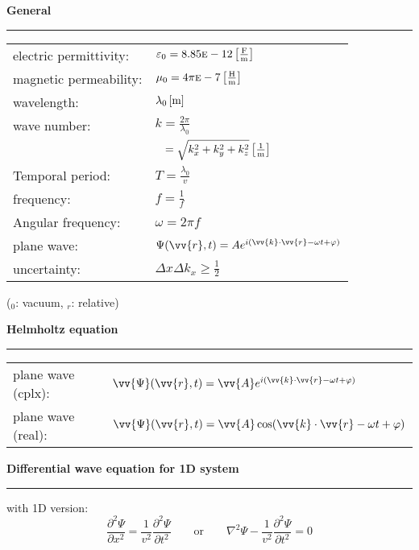 
\vspace{2mm}
\normalsize\textbf{General}\small
\hrule
\vspace{2pt}
{
	\setlength{\extrarowheight}{4pt}
	\begin{tabular}{l l}
		electric permittivity: & $\varepsilon_0 = 8.85\textsc{e}-12 \unit[2]{\frac{F}{m}}$          \\
		magnetic permeability: & $\mu_0=4\pi\textsc{e}-7 \unit[2]{\frac{H}{m}}$                     \\
		wavelength:            & $\lambda_0 \unit[2]{m}$                                            \\
		wave number:           & $k=\frac{2\pi}{\lambda_0}$                                         \\
		                       & $\phantom{k } = \sqrt{k_x^2+k_y^2+k_z^2} \unit[2]{\frac{1}{m}}$    \\
		Temporal period:       & $T = \frac{\lambda_0}{v}$                                          \\
		frequency:             & $f= \frac{1}{f}$                                                   \\
		Angular frequency:     & $\omega = 2\pi f$                                                  \\
		plane wave:            & $\Psi(\vv{r},t) = Ae^{i(\vv{k}\cdot \vv{r} - \omega t + \varphi)}$ \\
		uncertainty:           & $\Delta x \Delta k_x \geq \frac{1}{2}$
	\end{tabular}\newline
}
($_0$: vacuum, $_r$: relative)

\vspace{2mm}
\normalsize\textbf{Helmholtz equation}\small
\hrule
{
	\setlength{\extrarowheight}{4pt}
	\begin{tabular}{l l}
		plane wave (cplx): & \tiny$\vv{\Psi}(\vv{r},t) = \vv{A}e^{i(\vv{k}\cdot \vv{r} - \omega t + \varphi)}$\small \\
		plane wave (real): & \tiny$\vv{\Psi}(\vv{r},t) = \vv{A}\cos(\vv{k}\cdot \vv{r} - \omega t + \varphi)$\small  \\
	\end{tabular}\newline
}

\vspace{2mm}
\normalsize\textbf{Differential wave equation for 1D system}\small
\hrule
\vspace{2pt}
with 1D version:
$$ \frac{\partial^2\Psi}{\partial x^2} = \frac{1}{v^2} \frac{\partial^2\Psi}{\partial t^2} \hspace{2em}\text{or}\hspace{2em} \nabla^2 \Psi - \frac{1}{v^2} \frac{\partial^2\Psi}{\partial t^2} = 0$$

